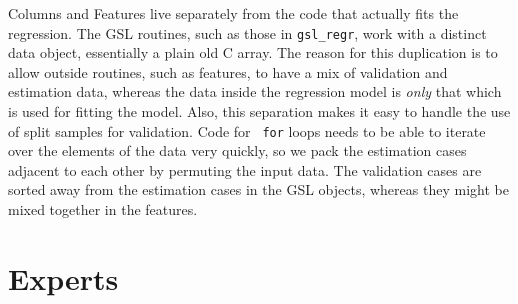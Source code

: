\documentclass[12pt]{article}
\begin{document}
 Columns and Features live separately from the code that actually fits the
 regression. The GSL routines, such as those in {\tt gsl\_regr}, work with a
 distinct data object, essentially a plain old C array.  The reason for this
 duplication is to allow outside routines, such as features, to have a mix of
 validation and estimation data, whereas the data inside the regression model is
 {\em only} that which is used for fitting the model.  Also, this separation
 makes it easy to handle the use of split samples for validation. Code for {\tt
 for} loops needs to be able to iterate over the elements of the data very
 quickly, so we pack the estimation cases adjacent to each other by permuting
 the input data.  The validation cases are sorted away from the estimation cases
 in the GSL objects, whereas they might be mixed together in the features.



\section{Experts} %
\end{document}
